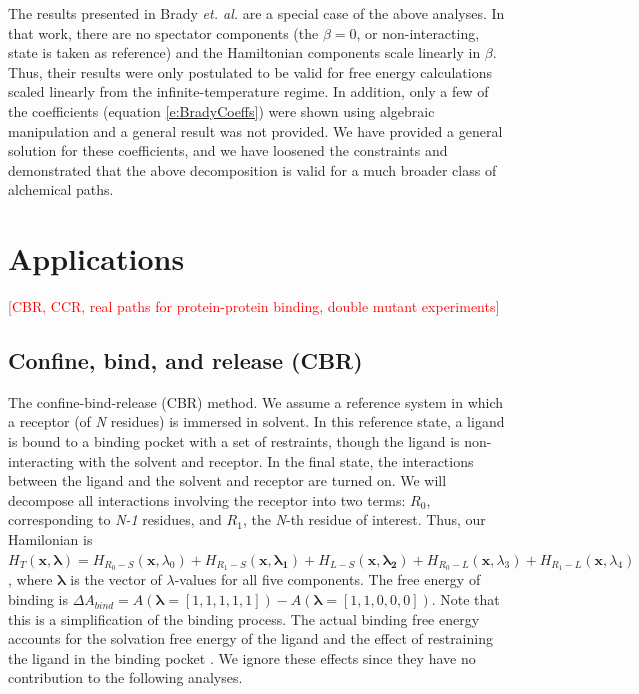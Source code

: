 \documentclass[%
 preprint,
 amsmath,amssymb,
 aps,
]{revtex4-1}
\newcommand{\warning}[1]{{\textsf{{\textcolor{red}{{[#1]}{}}}}}}
\renewcommand{\vec}[1]{{\mathbf{#1}}}
\begin{document}
The results presented in Brady \emph{et. al.}\cite{Brady:1996gm} are a special case of the above analyses.  In that work, there are no spectator components (the $\beta=0$, or non-interacting, state is taken as reference) and the Hamiltonian components scale linearly in $\beta$.  Thus, their results were only postulated to be valid for free energy calculations scaled linearly from the infinite-temperature regime.  In addition, only a  few of the coefficients (equation \ref{e:BradyCoeffs}) were shown using algebraic manipulation and a general result was not provided.  We have provided a general solution for these coefficients, and we have loosened the constraints and demonstrated that the above decomposition is valid for a much broader class of alchemical paths.  



\section{Applications}
\warning{CBR, CCR, real paths for protein-protein binding, double mutant experiments}



\subsection{Confine, bind, and release (CBR)}
The confine-bind-release (CBR) method.\cite{NULL}  We assume a reference system in which a receptor (of \emph{N} residues) is immersed in solvent.  In this reference state, a ligand is bound to a binding pocket with a set of restraints, though the ligand is non-interacting with the solvent and receptor.  In the final state, the interactions between the ligand and the solvent and receptor are turned on.  We will decompose all interactions involving the receptor into two terms: $R_0$, corresponding to \emph{N-1} residues, and $R_1$, the \emph{N}-th residue of interest.  Thus, our Hamilonian is 
$H_T (\vec{x},\vec{\lambda}) = H_{R_0-S}(\vec{x},\lambda_0)+H_{R_1-S}(\vec{x,\lambda_1})+H_{L-S}(\vec{x,\lambda_2})
+ H_{R_0-L}(\vec{x},\lambda_3)+H_{R_1-L}(\vec{x},\lambda_4)$, where $\vec{\lambda}$ is the vector of $\lambda$-values for all five components. 
The free energy of binding is 
$\Delta A_{bind} = A\left(\vec{\lambda}=\left[1,1,1,1,1\right] \right) - 
A\left( \vec{\lambda} = \left[ 1,1,0,0,0 \right]   \right)$. 
Note that this is a simplification of the binding process.  The actual binding free energy accounts for the solvation free energy of the ligand and the effect of restraining the ligand in the binding pocket \cite{NULL}.  We ignore these effects
since they have no contribution to the following analyses. 
\end{document}

